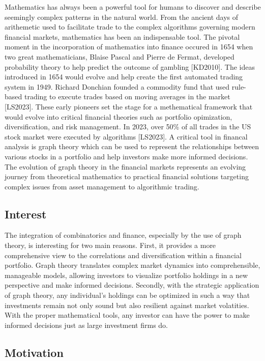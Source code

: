 \documentclass{article}
\begin{document}
Mathematics has always been a powerful tool for humans to discover and describe seemingly complex patterns in the natural world. From the ancient days of arithemetic used to facilitate trade to the complex algorithms governing modern financial markets, mathematics has been an indispensable tool. The pivotal moment in the incorporation of mathematics into finance occured in 1654 when two great mathematicians, Blaise Pascal and Pierre de Fermat, developed probability theory to help predict the outcome of gambling [KD2010]. The ideas introduced in 1654 would evolve and help create the first automated trading system in 1949. Richard Donchian founded a commodity fund that used rule-based trading to execute trades based on moving averages in the market [LS2023]. These early pioneers set the stage for a methematical framework that would evolve into critical financial theories such as portfolio opimization, diversification, and risk management. In 2023, over 50\% of all trades in the US stock market were executed by algorithms [LS2023]. A critical tool in financal analysis is graph theory which can be used to represent the relationships between various stocks in a portfolio and help investors make more informed decisions. The evolution of graph theory in the financial markets represents an evolving journey from theoretical mathematics to practical financial solutions targeting complex issues from asset management to algorithmic trading.

\subsection{Interest}

The integration of combinatorics and finance, especially by the use of graph theory, is interesting for two main reasons. First, it provides a more comprehensive view to the correlations and diversification within a financial portfolio. Graph theory translates complex market dynamics into comprehensible, manageable models, allowing investors to visualize portfolio holdings in a new perspective and make informed decisions. Secondly, with the strategic application of graph theory, any individual's holdings can be optimized in such a way that investments remain not only sound but also resilient against market volatities. With the proper mathematical tools, any investor can have the power to make informed decisions just as large investment firms do.

\subsection{Motivation}
\end{document}
